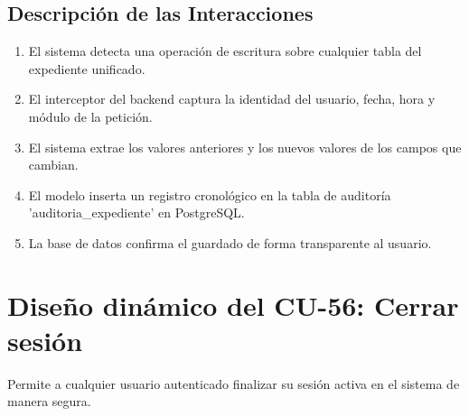 \subsection{Descripción de las Interacciones}
\begin{enumerate}
    \item El sistema detecta una operación de escritura sobre cualquier tabla del expediente unificado.
    \item El interceptor del backend captura la identidad del usuario, fecha, hora y módulo de la petición.
    \item El sistema extrae los valores anteriores y los nuevos valores de los campos que cambian.
    \item El modelo inserta un registro cronológico en la tabla de auditoría 'auditoria\_expediente' en PostgreSQL.
    \item La base de datos confirma el guardado de forma transparente al usuario.
\end{enumerate}

\cleardoublepage
\section{Diseño dinámico del CU-56: Cerrar sesión}
\label{sec:disenoDinamicoCU56}

Permite a cualquier usuario autenticado finalizar su sesión activa en el sistema de manera segura.

